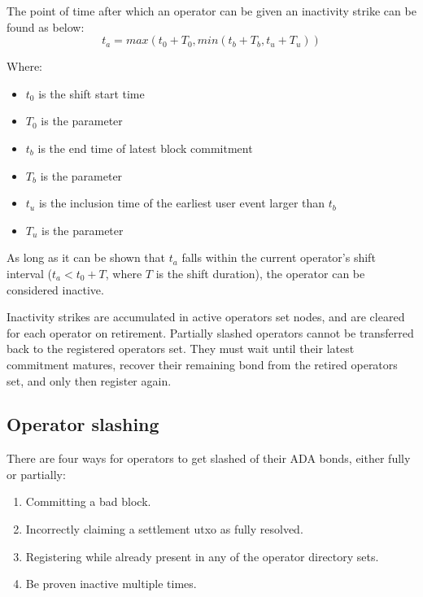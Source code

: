\documentclass[../midgard.tex]{subfiles}
\begin{document}
The point of time after which an operator can be given an inactivity strike can be found as below:
\begin{equation*}
  t_a = max(t_0 + T_0, min(t_b + T_b, t_u + T_u))
\end{equation*}

Where:
\begin{itemize}
  \item \(t_0\) is the shift start time
  \item \(T_0\) is the  parameter
  \item \(t_b\) is the end time of latest block commitment
  \item \(T_b\) is the  parameter
  \item \(t_u\) is the inclusion time of the earliest user event larger than \(t_b\)
  \item \(T_u\) is the  parameter
\end{itemize}

As long as it can be shown that \(t_a\) falls within the current operator's shift interval (\(t_a < t_0 + T\), where \(T\) is the shift duration), the operator can be considered inactive.

Inactivity strikes are accumulated in active operators set nodes, and are cleared for each operator on retirement.
Partially slashed operators cannot be transferred back to the registered operators set.
They must wait until their latest commitment matures, recover their remaining bond from the retired operators set, and only then register again.

\subsection{Operator slashing}
\label{h:operator-slashing}

There are four ways for operators to get slashed of their ADA bonds, either fully or partially:
\begin{enumerate}
  \item Committing a bad block.
  \item Incorrectly claiming a settlement utxo as fully resolved.
  \item Registering while already present in any of the operator directory sets.
  \item Be proven inactive multiple times.
\end{enumerate}
\end{document}
